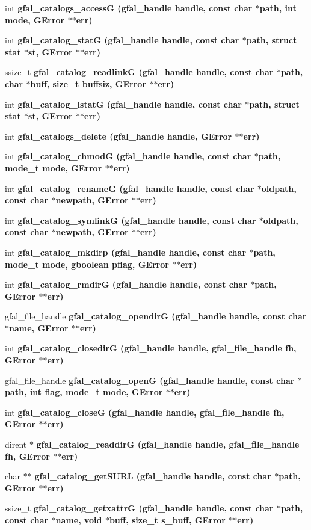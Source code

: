\begin{CompactItemize}
\item 
int \bf{gfal\_\-catalogs\_\-access\-G} (gfal\_\-handle handle, const char $\ast$path, int mode, GError $\ast$$\ast$err)
\item 
int \bf{gfal\_\-catalog\_\-stat\-G} (gfal\_\-handle handle, const char $\ast$path, struct stat $\ast$st, GError $\ast$$\ast$err)
\item 
ssize\_\-t \bf{gfal\_\-catalog\_\-readlink\-G} (gfal\_\-handle handle, const char $\ast$path, char $\ast$buff, size\_\-t buffsiz, GError $\ast$$\ast$err)
\item 
int \bf{gfal\_\-catalog\_\-lstat\-G} (gfal\_\-handle handle, const char $\ast$path, struct stat $\ast$st, GError $\ast$$\ast$err)
\item 
int \bf{gfal\_\-catalogs\_\-delete} (gfal\_\-handle handle, GError $\ast$$\ast$err)
\item 
int \bf{gfal\_\-catalog\_\-chmod\-G} (gfal\_\-handle handle, const char $\ast$path, mode\_\-t mode, GError $\ast$$\ast$err)
\item 
int \bf{gfal\_\-catalog\_\-rename\-G} (gfal\_\-handle handle, const char $\ast$oldpath, const char $\ast$newpath, GError $\ast$$\ast$err)
\item 
int \bf{gfal\_\-catalog\_\-symlink\-G} (gfal\_\-handle handle, const char $\ast$oldpath, const char $\ast$newpath, GError $\ast$$\ast$err)
\item 
int \bf{gfal\_\-catalog\_\-mkdirp} (gfal\_\-handle handle, const char $\ast$path, mode\_\-t mode, gboolean pflag, GError $\ast$$\ast$err)
\item 
int \bf{gfal\_\-catalog\_\-rmdir\-G} (gfal\_\-handle handle, const char $\ast$path, GError $\ast$$\ast$err)
\item 
gfal\_\-file\_\-handle \bf{gfal\_\-catalog\_\-opendir\-G} (gfal\_\-handle handle, const char $\ast$name, GError $\ast$$\ast$err)
\item 
int \bf{gfal\_\-catalog\_\-closedir\-G} (gfal\_\-handle handle, gfal\_\-file\_\-handle fh, GError $\ast$$\ast$err)
\item 
gfal\_\-file\_\-handle \bf{gfal\_\-catalog\_\-open\-G} (gfal\_\-handle handle, const char $\ast$path, int flag, mode\_\-t mode, GError $\ast$$\ast$err)
\item 
int \bf{gfal\_\-catalog\_\-close\-G} (gfal\_\-handle handle, gfal\_\-file\_\-handle fh, GError $\ast$$\ast$err)
\item 
dirent $\ast$ \bf{gfal\_\-catalog\_\-readdir\-G} (gfal\_\-handle handle, gfal\_\-file\_\-handle fh, GError $\ast$$\ast$err)
\item 
char $\ast$$\ast$ \bf{gfal\_\-catalog\_\-get\-SURL} (gfal\_\-handle handle, const char $\ast$path, GError $\ast$$\ast$err)
\item 
ssize\_\-t \bf{gfal\_\-catalog\_\-getxattr\-G} (gfal\_\-handle handle, const char $\ast$path, const char $\ast$name, void $\ast$buff, size\_\-t s\_\-buff, GError $\ast$$\ast$err)\label{gfal__common__catalog_8c_27b4d14215f7f57a06066ec682569bf3}


\end{CompactItemize}
